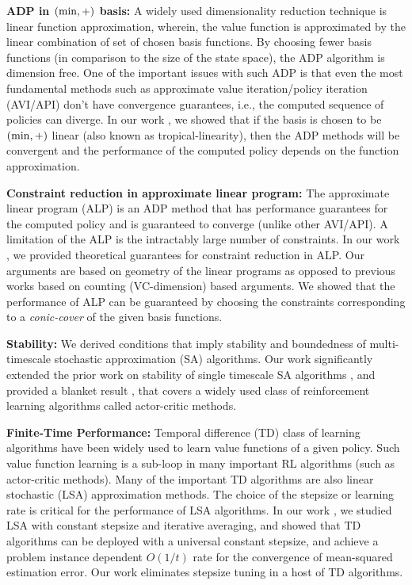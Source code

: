 \documentclass[onecolumn,12pt]{IEEEtran}
\begin{document}
\textbf{ADP in $(\min,+)$ basis:} A widely used dimensionality reduction technique is linear function approximation, wherein, the value function is approximated by the linear combination of set of chosen basis functions. By choosing fewer basis functions (in comparison to the size of the state space), the ADP algorithm is dimension free.
One of the important issues with such ADP is that even the most fundamental methods such as approximate value iteration/policy iteration (AVI/API) don't have convergence guarantees, i.e., the computed sequence of policies can diverge. In our work \cite{cdc}, we showed that if the basis is chosen to be $(\min,+)$ linear (also known as tropical-linearity), then the ADP methods will be convergent and the performance of the computed policy depends on the function approximation.  

\textbf{Constraint reduction in approximate linear program:} The approximate linear program (ALP) is an ADP method that has performance guarantees \cite{alp} for the computed policy and is guaranteed to converge (unlike other AVI/API). A limitation of the ALP is the intractably large number of constraints. In our work \cite{alp-aaai,alp-ieee}, we provided theoretical guarantees for constraint reduction in ALP. Our arguments are based on geometry of the linear programs as opposed to previous works based on counting (VC-dimension) based arguments. We showed that the performance of ALP can be guaranteed by choosing the constraints corresponding to a \emph{conic-cover} of the given basis functions.

\textbf{Stability:} We derived conditions that imply stability and boundedness of multi-timescale stochastic approximation (SA) algorithms. Our work significantly extended the prior work on stability of single timescale SA algorithms \cite{borkar-meyn}, and provided a blanket result \cite{automatica}, that covers a widely used class of reinforcement learning algorithms called actor-critic methods. 

\textbf{Finite-Time Performance:} Temporal difference (TD) class of learning algorithms have been widely used to learn value functions of a given policy. Such value function learning is a sub-loop in many important RL algorithms (such as actor-critic methods). Many of the important TD algorithms are also linear stochastic (LSA) approximation methods. The choice of the stepsize or learning rate is critical for the performance of LSA algorithms. In our work \cite{aistats}, we studied LSA with constant stepsize and iterative averaging, and showed that TD algorithms can be deployed with a universal constant stepsize, and achieve a problem instance dependent $O(1/t)$ rate for the convergence of mean-squared estimation error. Our work eliminates stepsize tuning in a host of TD algorithms.
\end{document}
